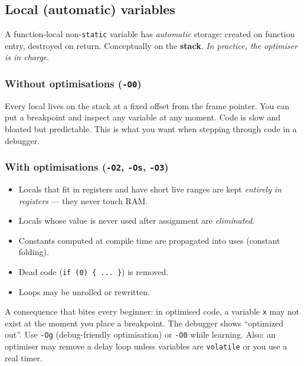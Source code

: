 \documentclass[11pt,a4paper]{article}
\begin{document}
\subsection{Local (automatic) variables}

A function-local non-\texttt{static} variable has \emph{automatic} storage:
created on function entry, destroyed on return. Conceptually on the
\textbf{stack}. \emph{In practice, the optimiser is in charge}.

\subsubsection{Without optimisations (\texttt{-O0})}

Every local lives on the stack at a fixed offset from the frame pointer.
You can put a breakpoint and inspect any variable at any moment. Code is
slow and bloated but predictable. This is what you want when stepping
through code in a debugger.

\subsubsection{With optimisations (\texttt{-O2}, \texttt{-Os}, \texttt{-O3})}

\begin{itemize}[leftmargin=*]
    \item Locals that fit in registers and have short live ranges are kept
    \emph{entirely in registers} --- they never touch RAM.
    \item Locals whose value is never used after assignment are \emph{eliminated}.
    \item Constants computed at compile time are propagated into uses
    (constant folding).
    \item Dead code (\texttt{if (0) \{ ... \}}) is removed.
    \item Loops may be unrolled or rewritten.
\end{itemize}

\begin{warning}
A consequence that bites every beginner: in optimised code, a variable
\texttt{x} may not exist at the moment you place a breakpoint. The debugger
shows ``optimized out''. Use \texttt{-Og} (debug-friendly optimisation) or
\texttt{-O0} while learning. Also: an optimiser may remove a delay loop
unless variables are \texttt{volatile} or you use a real timer.
\end{warning}
\end{document}
